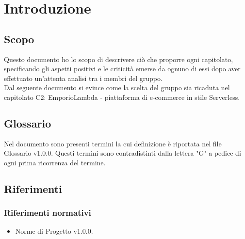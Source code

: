 \section{Introduzione}
\subsection{Scopo}
Questo documento ho lo scopo di descrivere ciò che proporre ogni capitolato, specificando gli aspetti positivi e le criticità emerse da ognuno di essi dopo aver effettuato un'attenta analisi tra i membri del gruppo.\\
Dal seguente documento si evince come la scelta del gruppo sia ricaduta nel capitolato C2: EmporioLambda - piattaforma di e-commerce in stile Serverless.

\subsection{Glossario}
Nel documento sono presenti termini la cui definizione è riportata nel file Glossario v1.0.0. Questi termini sono contradistinti dalla lettera "G" a pedice di ogni prima ricorrenza del termine.

\subsection{Riferimenti}
\subsubsection{Riferimenti normativi}
\begin{itemize}
    \item Norme di Progetto v1.0.0.
\end{itemize}

